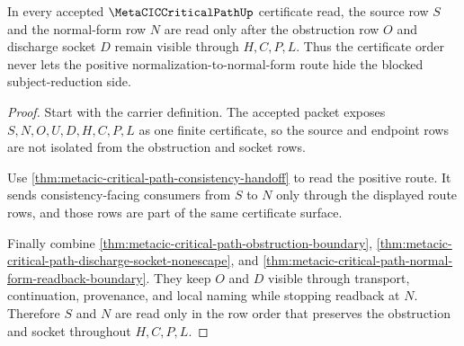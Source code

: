 \begin{theorem}
\label{thm:metacic-critical-path-certificate-row-order}
In every accepted $\MetaCICCriticalPathUp$ certificate read, the source row $S$ and the normal-form row $N$ are read only after the obstruction row $O$ and discharge socket $D$ remain visible through $H,C,P,L$. Thus the certificate order never lets the positive normalization-to-normal-form route hide the blocked subject-reduction side.
\end{theorem}
\begin{proof}
Start with the carrier definition. The accepted packet exposes $S,N,O,U,D,H,C,P,L$ as one finite certificate, so the source and endpoint rows are not isolated from the obstruction and socket rows.

Use \autoref{thm:metacic-critical-path-consistency-handoff} to read the positive route. It sends consistency-facing consumers from $S$ to $N$ only through the displayed route rows, and those rows are part of the same certificate surface.

Finally combine \autoref{thm:metacic-critical-path-obstruction-boundary}, \autoref{thm:metacic-critical-path-discharge-socket-nonescape}, and \autoref{thm:metacic-critical-path-normal-form-readback-boundary}. They keep $O$ and $D$ visible through transport, continuation, provenance, and local naming while stopping readback at $N$. Therefore $S$ and $N$ are read only in the row order that preserves the obstruction and socket throughout $H,C,P,L$.
\end{proof}
